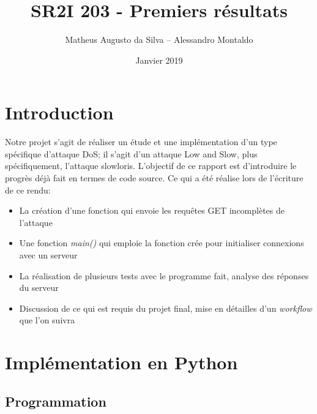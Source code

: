 \documentclass{article}
\author{Matheus Augusto da Silva -- Alessandro Montaldo}
\title{\textbf{SR2I 203 - Premiers résultats}}
\date{Janvier 2019}
\begin{document}
\maketitle
\tableofcontents

\section{Introduction}
Notre projet s'agit de réaliser un étude et une implémentation d'un type spécifique d'attaque DoS; il s'agit d'un attaque Low and Slow, plus spécifiquement,
l'attaque slowloris. L’objectif de ce rapport est d'introduire le progrès déjà fait en termes de code source. Ce qui a été réalise lors de l'écriture de
ce rendu:

\begin{itemize}
    \item La création d'une fonction qui envoie les requêtes GET incomplètes de l'attaque
    \item Une fonction \textit{main()} qui emploie la fonction crée pour initialiser connexions avec un serveur
    \item La réalisation de plusieurs tests avec le programme fait, analyse des réponses du serveur
    \item Discussion de ce qui est requis du projet final, mise en détailles d'un \textit{workflow} que l'on suivra
\end{itemize}

\section{Implémentation en Python}
\subsection{Programmation}
\end{document}
